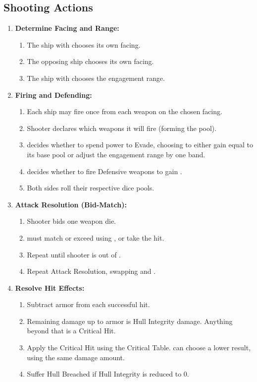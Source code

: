 \FleeSidebar

\subsection{Shooting Actions}

\begin{enumerate}
    \item \textbf{Determine Facing and Range:}
    \begin{enumerate}
        \item The ship with \advantage{} chooses its own facing.
        \item The opposing ship chooses its own facing.
		\item The ship with \advantage{} chooses the engagement range.
    \end{enumerate}

    \item \textbf{Firing and Defending:}
    \begin{enumerate}
        \item Each ship may fire once from each weapon on the chosen facing.
        \item Shooter declares which weapons it will fire (forming the \dicetype{\attack} pool).
        \item {} decides whether to spend power to Evade, choosing to either gain \dicetype{\evasion} equal to its base \dicetype{\maneuver} pool or adjust the engagement range by one band.
        \item {} decides whether to fire Defensive weapons to gain \dicetype{\evasion}.
        \item Both sides roll their respective dice pools.
    \end{enumerate}

    \item \textbf{Attack Resolution (Bid-Match):}
    \begin{enumerate}
        \item Shooter bids one weapon die.
        \item {} must match or exceed using \dicetype{\evasion}, or take the hit.
        \item Repeat until shooter is out of \dicetype{\attack}.
        \item Repeat Attack Resolution, swapping \attacker{} and .
    \end{enumerate}

    \item \textbf{Resolve Hit Effects:}
    \begin{enumerate}
        \item Subtract armor from each successful hit.
        \item Remaining damage up to armor is Hull Integrity damage. Anything beyond that is a Critical Hit.
        \item Apply the Critical Hit using the Critical Table. \attacker can choose a lower result, using the same damage amount.
		\item Suffer Hull Breached if Hull Integrity is reduced to 0.
    \end{enumerate}
\end{enumerate}

